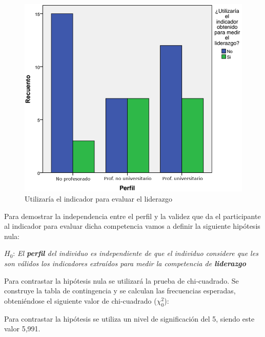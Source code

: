\begin{figure}
  \begin{center}
    \includegraphics[scale=0.3]{barras_perfil_liderazgo.png}
  \end{center}
  \caption{Utilizaría el indicador para evaluar el liderazgo}
  \label{fig:app:barras:perfil:liderazgo}
\end{figure}

Para demostrar la independencia entre el perfil y la validez que da el participante al indicador para evaluar dicha competencia vamos a definir la siguiente hipótesis nula:

\begin{mdframed}[style=hipotesis0]
$H_0$: \emph{El \textbf{perfil} del individuo es independiente de que el individuo considere que les son válidos los indicadores extraídos para medir la competencia de \textbf{liderazgo}}
\end{mdframed}

Para contrastar la hipótesis nula se utilizará la prueba de chi-cuadrado. Se construye la tabla de contingencia y se calculan las frecuencias esperadas, obteniéndose el siguiente valor de chi-cuadrado ($\chi^2_0$): 

\begin{center}
\end{center}

Para contrastar la hipótesis se utiliza un nivel de significación del 5\percentage, siendo este valor 5,991. 

